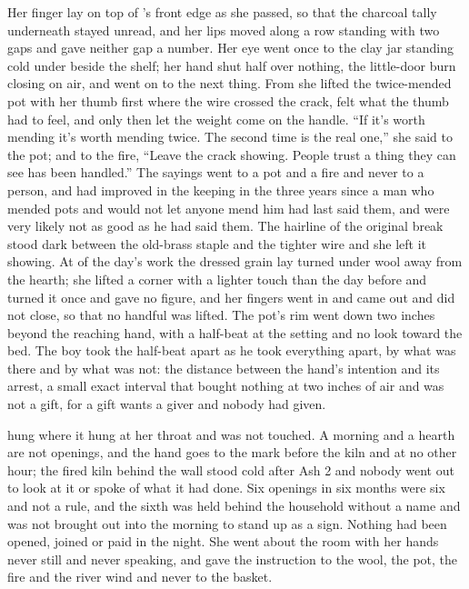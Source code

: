 Her finger lay on top of 's front edge as she passed, so that the charcoal tally underneath stayed unread, and her lips moved along a row standing with two gaps and gave neither gap a number. Her eye went once to the clay jar standing cold under  beside the shelf; her hand shut half over nothing, the little-door burn closing on air, and went on to the next thing. From  she lifted the twice-mended pot with her thumb first where the wire crossed the crack, felt what the thumb had to feel, and only then let the weight come on the handle. “If it's worth mending it's worth mending twice. The second time is the real one,” she said to the pot; and to the fire, “Leave the crack showing. People trust a thing they can see has been handled.” The sayings went to a pot and a fire and never to a person, and had improved in the keeping in the three years since a man who mended pots and would not let anyone mend him had last said them, and were very likely not as good as he had said them. The hairline of the original break stood dark between the old-brass staple and the tighter wire and she left it showing. At  of the day's work the dressed grain lay turned under wool away from the hearth; she lifted a corner with a lighter touch than the day before and turned it once and gave no figure, and her fingers went in and came out and did not close, so that no handful was lifted. The pot's rim went down two inches beyond the reaching hand, with a half-beat at the setting and no look toward the bed. The boy took the half-beat apart as he took everything apart, by what was there and by what was not: the distance between the hand's intention and its arrest, a small exact interval that bought nothing at two inches of air and was not a gift, for a gift wants a giver and nobody had given.

 hung where it hung at her throat and was not touched. A morning and a hearth are not openings, and the hand goes to the mark before the kiln and at no other hour; the fired kiln behind the wall stood cold after Ash 2 and nobody went out to look at it or spoke of what it had done. Six openings in six months were six and not a rule, and the sixth was held behind the household without a name and was not brought out into the morning to stand up as a sign. Nothing had been opened, joined or paid in the night. She went about the room with her hands never still and never speaking, and gave the instruction to the wool, the pot, the fire and the river wind and never to the basket.

